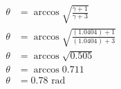\documentclass[11pt,letterpaper, twocolumn]{article}
\begin{document}
\begin{align*}
    \theta &= \arccos \sqrt{\frac{\gamma +1}{\gamma +3}}\\
    \theta &= \arccos \sqrt{\frac{(1.0404) +1}{(1.0404) +3}}\\
    \theta &= \arccos \sqrt{0.505}\\
    \theta &= \arccos 0.711\\
    \theta &= 0.78 \text{ rad}
\end{align*}
\end{document}
